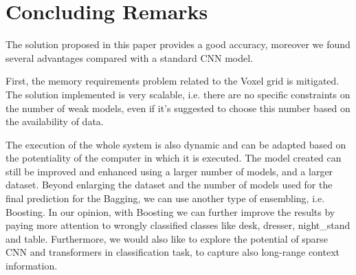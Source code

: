 
\section{Concluding Remarks}
\label{sec:conclusions}

The solution proposed in this paper provides a good accuracy, moreover we found  several advantages compared with a standard CNN model.

First, the memory requirements problem related to the Voxel grid is mitigated. 
The solution implemented is very scalable, i.e. there are no specific constraints on the number of weak models, even if it's suggested to choose this number based on the availability of data. 

The execution of the whole system is also dynamic and can be adapted based on the potentiality of the computer in which it is executed. 
The model created can still be improved and enhanced using a larger number of models, and a larger dataset. 
Beyond enlarging the dataset and the number of models used for the final prediction for the Bagging, we can use another type of ensembling, i.e. Boosting. In our opinion, with Boosting we can further improve the results by paying more attention to wrongly classified classes like desk, dresser, night\_stand and table.
Furthermore, we would also like to explore the potential of sparse CNN \cite{graham2017submanifold} and transformers \cite{mao2021voxel} in classification task, to capture also long-range context information.\\

